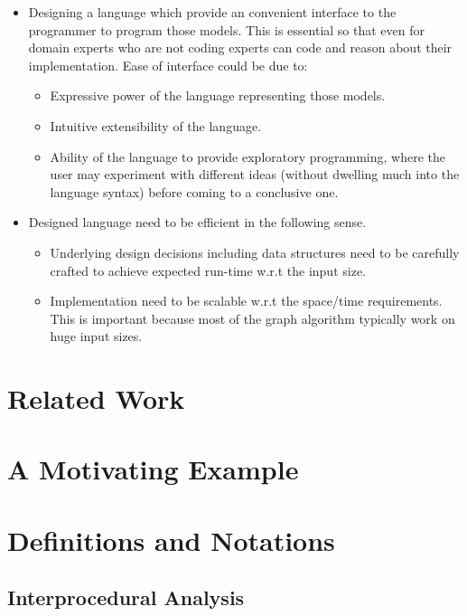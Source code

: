 \documentclass[letterpaper]{sig-alternate}
\begin{document}
    \begin{itemize}
      \item Designing a language which provide an convenient interface to the programmer to program those models.
        This is essential so that even for domain experts who are not coding experts can code and reason about
        their implementation.
        Ease of interface could be due to:
        \begin{itemize}
          \item Expressive power of the language representing those models.
          \item Intuitive extensibility of the language.
          \item Ability of the language to provide exploratory programming, where the user
          may experiment with different ideas (without dwelling much into the language syntax) before coming to a conclusive one.
        \end{itemize}
     \item Designed language need to be efficient in the following sense.     
        \begin{itemize}
          \item Underlying design decisions including data structures need to be carefully crafted 
            to achieve expected run-time w.r.t the input size.
          \item Implementation need to be scalable w.r.t the space/time requirements. This is 
          important because most of the graph algorithm typically work
          on huge input sizes.
        \end{itemize}
   \end{itemize}       


\section{Related Work}\label{sec:bgrel}

\section{A Motivating Example}\label{sec:motiv}


\section{Definitions and Notations} \label{sec:Formal_Definitions}


\subsection{Interprocedural Analysis}
\label{Interprocedural_Analysis}




%  
\end{document}
